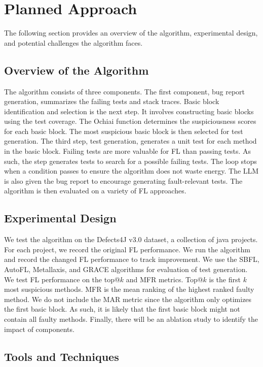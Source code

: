 \documentclass[conference]{IEEEtran}
\begin{document}
\section{Planned Approach}

The following section provides an overview of the algorithm, experimental design, and potential challenges the algorithm faces.

\subsection{Overview of the Algorithm}

The algorithm consists of three components. The first component, bug report generation, summarizes the failing tests and stack traces. Basic block identification and selection is the next step. It involves constructing basic blocks using the test coverage. The Ochiai function determines the suspiciousness scores for each basic block. The most suspicious basic block is then selected for test generation. The third step, test generation, generates a unit test for each method in the basic block. Failing tests are more valuable for FL than passing tests. As such, the step generates tests to search for a possible failing tests. The loop stops when a condition passes to ensure the algorithm does not waste energy. The LLM is also given the bug report to encourage generating fault-relevant tests. The algorithm is then evaluated on a variety of FL approaches.

\subsection{Experimental Design}

We test the algorithm on the Defects4J v3.0 \cite{ren2014defects4j} dataset, a collection of java projects. For each project, we record the original FL performance. We run the algorithm and record the changed FL performance to track improvement. We use the SBFL, AutoFL, Metallaxis, and GRACE algorithms for evaluation of test generation. We test FL performance on the top@$k$ and MFR metrics. Top@$k$ is the first $k$ most suspicious methods. MFR is the mean ranking of the highest ranked faulty method. We do not include the MAR metric since the algorithm only optimizes the first basic block. As such, it is likely that the first basic block might not contain all faulty methods. Finally, there will be an ablation study to identify the impact of components.

\subsection{Tools and Techniques}
\end{document}
